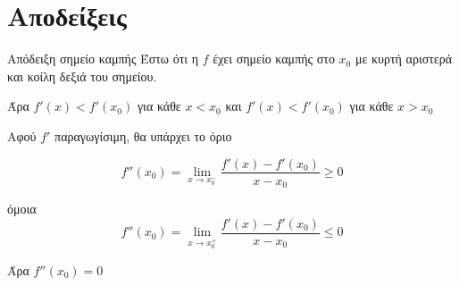 \documentclass{presentation}
\begin{document}
\appendix

\section{Αποδείξεις}
\begin{frame}[label=Απόδειξη1]{Απόδειξη σημείο καμπής}
   Έστω ότι η $f$ έχει σημείο καμπής στο $x_0$ με κυρτή αριστερά και κοίλη δεξιά του σημείου.

  Άρα $f'(x)< f'(x_0)$ για κάθε $x<x_0$ και $f'(x)<f'(x_0)$ για κάθε $x>x_0$

   Αφού $f'$ παραγωγίσιμη, θα υπάρχει το όριο

  $$f''(x_0)=\lim\limits_{x \to x_0^-}{ \dfrac{f'(x)-f'(x_0)}{x-x_0} }\ge 0$$

   όμοια
  $$f''(x_0)=\lim\limits_{x \to x_0^+}{ \dfrac{f'(x)-f'(x_0)}{x-x_0} } \le 0$$

   Άρα $f''(x_0)=0$ \hyperlink{Θεώρημα1}{}
\end{frame}

\moodle
\end{document}
